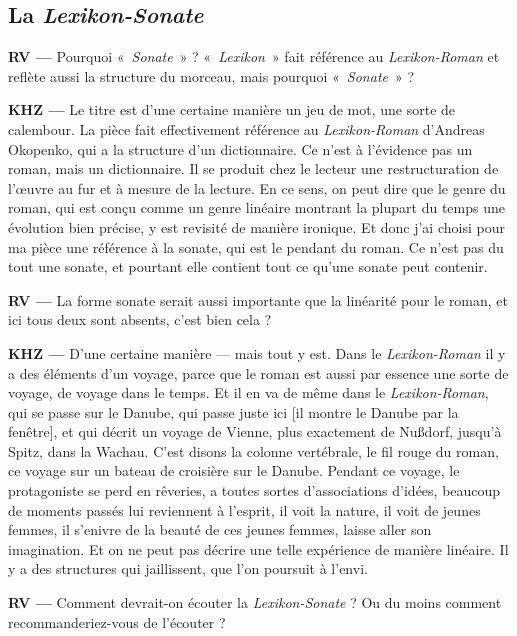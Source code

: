 \documentclass[a4paper,12pt]{article}
\newcommand{\guill}[1]{«~#1~»}
\begin{document}
\subsection{La \emph{Lexikon-Sonate}}

\textbf{RV ---} Pourquoi \guill{\emph{Sonate}} ? \guill{\emph{Lexikon}} fait référence au \emph{Lexikon-Roman} et reflète aussi la structure du morceau, mais pourquoi \guill{\emph{Sonate}} ?

\textbf{KHZ ---} Le titre est d'une certaine manière un jeu de mot, une sorte de calembour. La pièce fait effectivement référence au \emph{Lexikon-Roman} d'Andreas Okopenko, qui a la structure d'un dictionnaire. Ce n'est à l'évidence pas un roman, mais un dictionnaire. Il se produit chez le lecteur une restructuration de l'œuvre au fur et à mesure de la lecture. En ce sens, on peut dire que le genre du roman, qui est conçu comme un genre linéaire montrant la plupart du temps une évolution bien précise, y est revisité de manière ironique. Et donc j'ai choisi pour ma pièce une référence à la sonate, qui est le pendant du roman. Ce n'est pas du tout une sonate, et pourtant elle contient tout ce qu'une sonate peut contenir.

\textbf{RV ---} La forme sonate serait aussi importante que la linéarité pour le roman, et ici tous deux sont absents, c'est bien cela ?

\textbf{KHZ ---} D'une certaine manière --- mais tout y est. Dans le \emph{Lexikon-Roman} il y a des éléments d'un voyage, parce que le roman est aussi par essence une sorte de voyage, de voyage dans le temps. Et il en va de même dans le \emph{Lexikon-Roman}, qui se passe sur le Danube, qui passe juste ici [il montre le Danube par la fenêtre], et qui décrit un voyage de Vienne, plus exactement de Nußdorf, jusqu'à Spitz, dans la Wachau. C'est disons la colonne vertébrale, le fil rouge du roman, ce voyage sur un bateau de croisière sur le Danube. Pendant ce voyage, le protagoniste se perd en rêveries, a toutes sortes d'associations d'idées, beaucoup de moments passés lui reviennent à l'esprit, il voit la nature, il voit de jeunes femmes, il s'enivre de la beauté de ces jeunes femmes, laisse aller son imagination. Et on ne peut pas décrire une telle expérience de manière linéaire. Il y a des structures qui jaillissent, que l'on poursuit à l'envi.

\textbf{RV ---} Comment devrait-on écouter la \emph{Lexikon-Sonate} ? Ou du moins comment recommanderiez-vous de l'écouter ?
\end{document}
